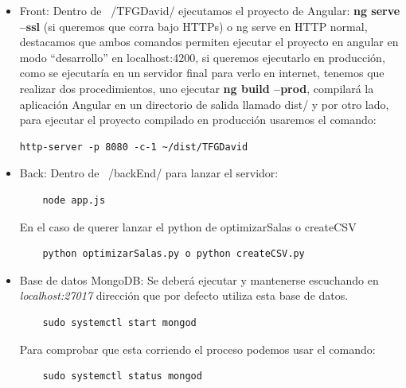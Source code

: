 \documentclass[a4paper, 12pt]{book}
\begin{document}
\begin{itemize}
  \item Front: Dentro de ~/TFGDavid/ ejecutamos el proyecto de Angular:
	\textbf{ng serve --ssl} (si queremos que corra bajo HTTPs) o ng serve en HTTP normal, destacamos que ambos comandos permiten ejecutar el proyecto en angular en modo ``desarrollo'' en localhost:4200, si queremos ejecutarlo en producción, como se ejecutaría en un servidor final para verlo en internet, tenemos que realizar dos procedimientos, uno ejecutar \textbf{ng build --prod}, compilará la aplicación Angular en un directorio de salida llamado dist/ y por otro lado, para ejecutar el proyecto compilado en producción usaremos el comando:
\begin{verbatim}
http-server -p 8080 -c-1 ~/dist/TFGDavid
\end{verbatim}

	
\item Back: Dentro de ~/backEnd/ para lanzar el servidor: 

	\begin{verbatim}
	node app.js
	\end{verbatim}

En el caso de querer lanzar el python de optimizarSalas o createCSV
	\begin{verbatim}
	python optimizarSalas.py o python createCSV.py
	\end{verbatim}
	
\item Base de datos MongoDB: Se deberá ejecutar y mantenerse escuchando en \textit{localhost:27017} dirección que por defecto utiliza esta base de datos.

	\begin{verbatim}
	sudo systemctl start mongod
	\end{verbatim}

Para comprobar que esta corriendo el proceso podemos usar el comando:

	\begin{verbatim}
	sudo systemctl status mongod
	\end{verbatim}

\end{itemize}

\cleardoublepage

\nocite{*}

  

\end{document}
